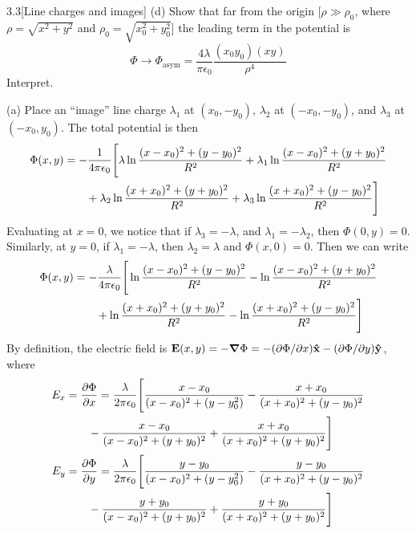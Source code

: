 \documentclass[12pt]{article}
\begin{document}
\begin{problem}{3.3}[Line charges and images]
(d) Show that far from the origin [$\rho\gg\rho_0$, where $\rho=\sqrt{x^2+y^2}$
and $\rho_0=\sqrt{x_0^2+y_0^2}$] the leading term in the potential is
\begin{equation}
    \Phi\to\Phi_{\text{asym}}=\frac{4\lambda}{\pi\epsilon_0}\frac{(x_0y_0)(xy)}{\rho^4} 
\end{equation}
Interpret.
\begin{solution}
    (a) Place an ``image'' line charge $\lambda_1$ at $(x_0,-y_0)$, $\lambda_2$
    at $(-x_0,-y_0)$, and $\lambda_3$ at $(-x_0,y_0)$. The total potential is
    then
    \begin{align}
        \Phi(x,y)
        &=-\frac1{4\pi\epsilon_0}\Bigg[\lambda\ln\frac{(x-x_0)^2+(y-y_0)^2}{R^2}
            +\lambda_1\ln\frac{(x-x_0)^2+(y+y_0)^2}{R^2}\notag\\
        &\qquad+\lambda_2\ln\frac{(x+x_0)^2+(y+y_0)^2}{R^2}
        +\lambda_3\ln\frac{(x+x_0)^2+(y-y_0)^2}{R^2}
            \Bigg] 
    \end{align}
    Evaluating at $x=0$, we notice that if $\lambda_3=-\lambda$, and
    $\lambda_1=-\lambda_2$, then $\Phi(0,y)=0$. Similarly, at $y=0$, if
    $\lambda_1=-\lambda$, then $\lambda_2=\lambda$ and $\Phi(x,0)=0$. Then we
    can write
    \begin{align}\label{p3:Phi}
        \Phi(x,y)
        &=-\frac\lambda{4\pi\epsilon_0}
        \Bigg[\ln\frac{(x-x_0)^2+(y-y_0)^2}{R^2}
            -\ln\frac{(x-x_0)^2+(y+y_0)^2}{R^2}\notag\\
        &\qquad+\ln\frac{(x+x_0)^2+(y+y_0)^2}{R^2}
        -\ln\frac{(x+x_0)^2+(y-y_0)^2}{R^2}
            \Bigg] 
    \end{align}
    By definition, the electric field is $\vb{E}(x,y)=-\grad\Phi=-(\partial\Phi/\partial x)\vb{\hat{x}}-(\partial\Phi/\partial y)\vb{\hat{y}}$, where
    \begin{subequations}
        \begin{align}
            E_x&=\frac{\partial\Phi}{\partial x}=\frac{\lambda}{2\pi\epsilon_0}
        \Bigg[\frac{x-x_0}{(x-x_0)^2+(y-y_0^2)}-\frac{x+x_0}{(x+x_0)^2+(y-y_0)^2}\notag\\
               &\qquad-\frac{x-x_0}{(x-x_0)^2+(y+y_0)^2}+\frac{x+x_0}{(x+x_0)^2+(y+y_0)^2}\Bigg]\\
            E_y&=\frac{\partial\Phi}{\partial y}=\frac{\lambda}{2\pi\epsilon_0}
        \Bigg[\frac{y-y_0}{(x-x_0)^2+(y-y_0^2)}-\frac{y-y_0}{(x+x_0)^2+(y-y_0)^2}\notag\\
               &\qquad-\frac{y+y_0}{(x-x_0)^2+(y+y_0)^2}+\frac{y+y_0}{(x+x_0)^2+(y+y_0)^2}\Bigg]

\end{align}
\end{subequations}
\end{solution}
\end{problem}
\end{document}
